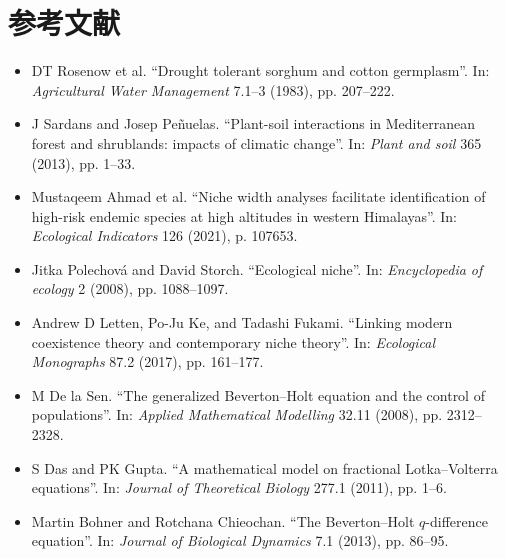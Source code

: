 \documentclass[11pt,a4paper]{ctexart}
\begin{document}
\section*{参考文献}

\begin{itemize}
\item[{[1]}] DT Rosenow et al. ``Drought tolerant sorghum and cotton germplasm''. In: \textit{Agricultural Water Management} 7.1--3 (1983), pp. 207--222.
\item[{[2]}] J Sardans and Josep Peñuelas. ``Plant-soil interactions in Mediterranean forest and shrublands: impacts of climatic change''. In: \textit{Plant and soil} 365 (2013), pp. 1--33.
\item[{[3]}] Mustaqeem Ahmad et al. ``Niche width analyses facilitate identification of high-risk endemic species at high altitudes in western Himalayas''. In: \textit{Ecological Indicators} 126 (2021), p. 107653.
\item[{[4]}] Jitka Polechová and David Storch. ``Ecological niche''. In: \textit{Encyclopedia of ecology} 2 (2008), pp. 1088--1097.
\item[{[5]}] Andrew D Letten, Po-Ju Ke, and Tadashi Fukami. ``Linking modern coexistence theory and contemporary niche theory''. In: \textit{Ecological Monographs} 87.2 (2017), pp. 161--177.
\item[{[6]}] M De la Sen. ``The generalized Beverton--Holt equation and the control of populations''. In: \textit{Applied Mathematical Modelling} 32.11 (2008), pp. 2312--2328.
\item[{[7]}] S Das and PK Gupta. ``A mathematical model on fractional Lotka--Volterra equations''. In: \textit{Journal of Theoretical Biology} 277.1 (2011), pp. 1--6.
\item[{[8]}] Martin Bohner and Rotchana Chieochan. ``The Beverton--Holt $q$-difference equation''. In: \textit{Journal of Biological Dynamics} 7.1 (2013), pp. 86--95.
\end{itemize}
\end{document}
